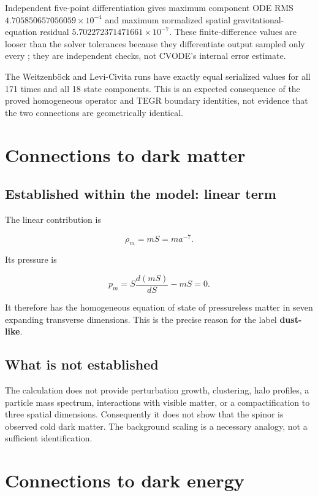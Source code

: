 \documentclass[11pt]{article}
\begin{document}
Independent five-point differentiation gives maximum component ODE RMS $4.705850657056059\times10^{-4}$ and maximum normalized spatial gravitational-equation residual $5.702272371471661\times10^{-7}$. These finite-difference values are looser than the solver tolerances because they differentiate output sampled only every \texttt{}; they are independent checks, not CVODE's internal error estimate.

The Weitzenböck and Levi-Civita runs have exactly equal serialized values for all 171 times and all 18 state components. This is an expected consequence of the proved homogeneous operator and TEGR boundary identities, not evidence that the two connections are geometrically identical.

\section{Connections to dark matter}

\subsection{Established within the model: linear term}

The linear contribution is

\[
\rho_m=mS=ma^{-7}.
\]

Its pressure is

\[
p_m=S\frac{d(mS)}{dS}-mS=0.
\]

It therefore has the homogeneous equation of state of pressureless matter in seven expanding transverse dimensions. This is the precise reason for the label \textbf{dust-like}.

\subsection{What is not established}

The calculation does not provide perturbation growth, clustering, halo profiles, a particle mass spectrum, interactions with visible matter, or a compactification to three spatial dimensions. Consequently it does not show that the spinor is observed cold dark matter. The background scaling is a necessary analogy, not a sufficient identification.

\section{Connections to dark energy}
\end{document}
